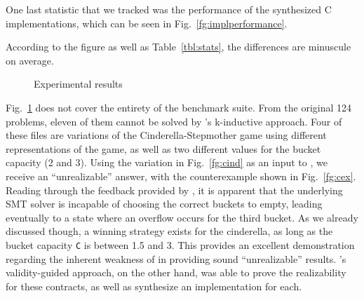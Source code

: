 One last statistic that we tracked was the performance of the synthesized C
implementations, which can be seen in Fig.~\ref{fg:implperformance}.
 \iffalse
  For this purpose, we translated the
 generated witnesses from \jsyn and \jsynvg solutions using
 \smtlibtoc under the same set of options.
 \fi
 According to the figure as well as Table~\ref{tbl:stats}, the differences are minuscule on average.
\iffalse 
while \jsyn implementations are faster, the difference is minuscule on average.
This small difference may occur due to the fact that \jsyn creates separate skolem functions for the initial evaluation
(when \%init is true)

and subsequent evaluations, whereas currently \jsynvg uses a single function for both cases, and as such requires the evaluation of richer expressions prior to choosing a proper reaction.
\fi


\begin{figure}[!t]
\centering
{}
\quad
{}
\quad
{}
\caption{Experimental results}
\vspace{-5pt}
\label{fg:results}
\end{figure}


Fig.~\ref{fg:results} does not cover the entirety of the
benchmark suite. From the original 124 problems, eleven of them cannot be
solved by \jsyn's k-inductive approach. 
Four of these files are variations of
the Cinderella-Stepmother game using different representations of the game, as well as two different values
for the bucket capacity (2 and 3). Using the variation in Fig.~\ref{fg:cind} as an input to \jsyn, we receive an ``unrealizable'' answer, with the counterexample shown
in Fig.~\ref{fg:cex}. Reading through the feedback provided by \jsyn, it is
apparent that the underlying SMT solver is incapable of choosing the correct
buckets to empty, leading eventually to a state where an overflow occurs for the
third bucket. As we already discussed though, a winning strategy exists for the
cinderella, as long as the bucket capacity \texttt{C} is between 1.5 and 3. This
provides an excellent demonstration regarding the inherent weakness of \jsyn
in providing sound ``unrealizable'' results. \jsynvg's validity-guided approach,
on the other hand, was able to prove the realizability for these contracts, as
well as synthesize an implementation for each.

